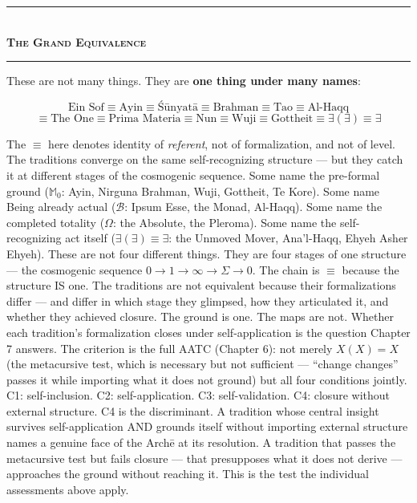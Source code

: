 \documentclass[10pt, openany, oneside]{book}
\renewcommand{\normalsize}{\fontsize{10}{13}\selectfont}
\begin{document}
\vspace{1em}

\begin{center}
    \rule{0.3\textwidth}{0.4pt}\\[0.5em]
    {\normalsize\bfseries\scshape The Grand Equivalence}\\[0.3em]
    \rule{0.3\textwidth}{0.4pt}
\end{center}

\vspace{0.8em}

\noindent These are not many things. They are \textbf{one thing under many names}:

$$\text{Ein Sof} \equiv \text{Ayin} \equiv \text{\'{S}\={u}nyat\={a}} \equiv \text{Brahman} \equiv \text{Tao} \equiv \text{Al-Haqq}$$
$$\equiv \text{The One} \equiv \text{Prima Materia} \equiv \text{Nun} \equiv \text{Wuji} \equiv \text{Gottheit} \equiv \exists(\exists) \equiv \exists$$

\noindent The $\equiv$ here denotes identity of \textit{referent}, not of formalization, and not of level. The traditions converge on the same self-recognizing structure --- but they catch it at different stages of the cosmogenic sequence. Some name the pre-formal ground ($\mathbb{M}_0$: Ayin, Nirguna Brahman, Wuji, Gottheit, Te Kore). Some name Being already actual ($\mathcal{B}$: Ipsum Esse, the Monad, Al-Haqq). Some name the completed totality ($\Omega$: the Absolute, the Pleroma). Some name the self-recognizing act itself ($\exists(\exists) \equiv \exists$: the Unmoved Mover, Ana'l-Haqq, Ehyeh Asher Ehyeh). These are not four different things. They are four stages of one structure --- the cosmogenic sequence $0 \to 1 \to \infty \to \Sigma \to 0$. The chain is $\equiv$ because the structure IS one. The traditions are not equivalent because their formalizations differ --- and differ in which stage they glimpsed, how they articulated it, and whether they achieved closure. The ground is one. The maps are not. Whether each tradition's formalization closes under self-application is the question Chapter 7 answers. The criterion is the full AATC (Chapter 6): not merely $X(X) = X$ (the metacursive test, which is necessary but not sufficient --- ``change changes'' passes it while importing what it does not ground) but all four conditions jointly. C1: self-inclusion. C2: self-application. C3: self-validation. C4: closure without external structure. C4 is the discriminant. A tradition whose central insight survives self-application AND grounds itself without importing external structure names a genuine face of the Arch\={e} at its resolution. A tradition that passes the metacursive test but fails closure --- that presupposes what it does not derive --- approaches the ground without reaching it. This is the test the individual assessments above apply.
\end{document}
